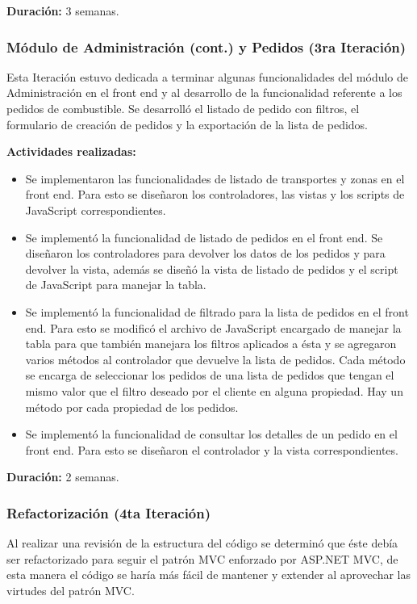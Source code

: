 \textbf{Duración:} 3 semanas.

\subsubsection{Módulo de Administración (cont.) y Pedidos (3ra Iteración)}
Esta Iteración estuvo dedicada a terminar algunas funcionalidades del módulo de Administración en el front end y al desarrollo de la funcionalidad referente a los pedidos de combustible. Se desarrolló el listado de pedido con filtros, el formulario de creación de pedidos y la exportación de la lista de pedidos.

\pagebreak
\textbf{Actividades realizadas:}
\begin{itemize}
    \item Se implementaron las funcionalidades de listado de transportes y zonas en el front end. Para esto se diseñaron los controladores, las vistas y los scripts de JavaScript correspondientes.
    \item Se implementó la funcionalidad de listado de pedidos en el front end. Se diseñaron los controladores para devolver los datos de los pedidos y para devolver la vista, además se diseñó la vista de listado de pedidos y el script de JavaScript para manejar la tabla.
    \item Se implementó la funcionalidad de filtrado para la lista de pedidos en el front end. Para esto se modificó el archivo de JavaScript encargado de manejar la tabla para que también manejara los filtros aplicados a ésta y se agregaron varios métodos al controlador que devuelve la lista de pedidos. Cada método se encarga de seleccionar los pedidos de una lista de pedidos que tengan el mismo valor que el filtro deseado por el cliente en alguna propiedad. Hay un método por cada propiedad de los pedidos.
    \item Se implementó la funcionalidad de consultar los detalles de un pedido en el front end. Para esto se diseñaron el controlador y la vista correspondientes.
\end{itemize}

\textbf{Duración:} 2 semanas.

\subsubsection{Refactorización (4ta Iteración)} \label{refactorizacion}
Al realizar una revisión de la estructura del código se determinó que éste debía ser refactorizado para seguir el patrón MVC enforzado por ASP.NET MVC, de esta manera el código se haría más fácil de mantener y extender al aprovechar las virtudes del patrón MVC.

